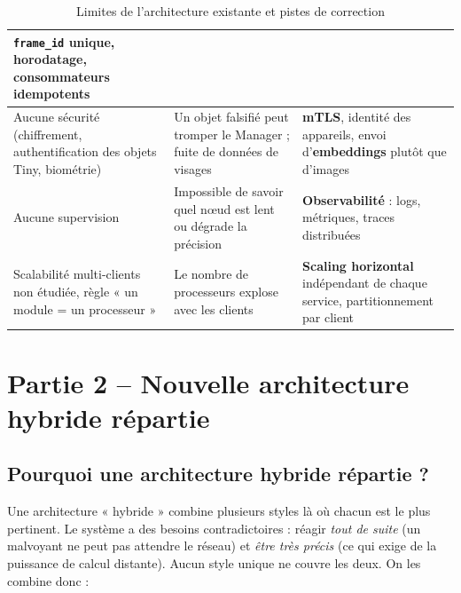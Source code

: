 \documentclass[11pt,a4paper]{article}
\begin{document}
\begin{table}[h]
\begin{tabular}{|p{4.6cm}|p{4.6cm}|p{4.6cm}|}
\texttt{frame\_id} unique, horodatage, consommateurs \textbf{idempotents} \\
\hline
Aucune sécurité (chiffrement, authentification des objets Tiny, biométrie) &
Un objet falsifié peut tromper le Manager ; fuite de données de visages &
\textbf{mTLS}, identité des appareils, envoi d'\textbf{embeddings} plutôt que d'images \\
\hline
Aucune supervision &
Impossible de savoir quel nœud est lent ou dégrade la précision &
\textbf{Observabilité} : logs, métriques, traces distribuées \\
\hline
Scalabilité multi-clients non étudiée, règle « un module = un processeur » &
Le nombre de processeurs explose avec les clients &
\textbf{Scaling horizontal} indépendant de chaque service, partitionnement par client \\
\hline
\end{tabular}
\caption{Limites de l'architecture existante et pistes de correction}
\end{table}

\section{Partie 2 -- Nouvelle architecture hybride répartie}

\subsection{Pourquoi une architecture hybride répartie ?}

Une architecture « hybride » combine plusieurs styles là où chacun est le plus pertinent. Le système a des besoins contradictoires : réagir \emph{tout de suite} (un malvoyant ne peut pas attendre le réseau) et \emph{être très précis} (ce qui exige de la puissance de calcul distante). Aucun style unique ne couvre les deux. On les combine donc :
\end{document}
